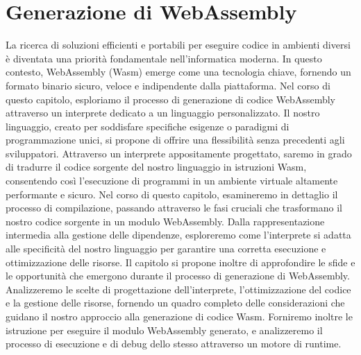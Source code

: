 \documentclass[../../main.tex]{subfiles}
\begin{document}
\chapter{Generazione di WebAssembly}
La ricerca di soluzioni efficienti e portabili per eseguire codice in ambienti diversi è diventata una priorità fondamentale nell'informatica moderna. In questo contesto, WebAssembly (Wasm) emerge come una tecnologia chiave, fornendo un formato binario sicuro, veloce e indipendente dalla piattaforma. Nel corso di questo capitolo, esploriamo il processo di generazione di codice WebAssembly attraverso un interprete dedicato a un linguaggio personalizzato.
Il nostro linguaggio, creato per soddisfare specifiche esigenze o paradigmi di programmazione unici, si propone di offrire una flessibilità senza precedenti agli sviluppatori. Attraverso un interprete appositamente progettato, saremo in grado di tradurre il codice sorgente del nostro linguaggio in istruzioni Wasm, consentendo così l'esecuzione di programmi in un ambiente virtuale altamente performante e sicuro.
Nel corso di questo capitolo, esamineremo in dettaglio il processo di compilazione, passando attraverso le fasi cruciali che trasformano il nostro codice sorgente in un modulo WebAssembly. Dalla rappresentazione intermedia alla gestione delle dipendenze, esploreremo come l'interprete si adatta alle specificità del nostro linguaggio per garantire una corretta esecuzione e ottimizzazione delle risorse.
Il capitolo si propone inoltre di approfondire le sfide e le opportunità che emergono durante il processo di generazione di WebAssembly. Analizzeremo le scelte di progettazione dell'interprete, l'ottimizzazione del codice e la gestione delle risorse, fornendo un quadro completo delle considerazioni che guidano il nostro approccio alla generazione di codice Wasm.
Forniremo inoltre le istruzione per eseguire il modulo WebAssembly generato, e analizzeremo il processo di esecuzione e di debug dello stesso attraverso un motore di runtime.\autocite{WebAssemblyInterfaceTypes}
\end{document}

